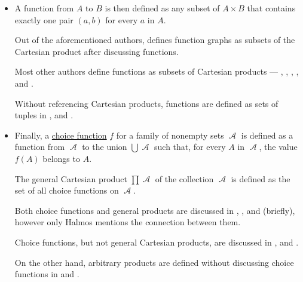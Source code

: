 \begin{remark}
\begin{itemize}
    \item A function from \( A \) to \( B \) is then defined as any subset of \( A \times B \) that contains exactly one pair \( (a, b) \) for every \( a \) in \( A \).

    Out of the aforementioned authors, \textcite[def. II.3.1]{Bourbaki2004TheoryOfSets} defines function graphs as subsets of the Cartesian product after discussing functions.

    Most other authors define functions as subsets of Cartesian products ---
    \cite[11]{Jech2006SetTheory},
    \cite[def. 6.2.8]{Hinman2005Logic},
    \cite[42]{Enderton1977SetTheory},
    \cite[30]{Halmos1960NaiveSetTheory},
    \cite[143]{КолмогоровДрагалин2006ЛогикаДополнительныеГлавы} and
    \cite[190]{Герасимов2014Вычислимость}.

    Without referencing Cartesian products, functions are defined as sets of tuples in
    \cite[def. I.6.3]{Kunen2013SetTheory},
    \cite[245]{Mendelson2015Logic} and
    \cite[\S 1.2.4]{КусраевКутателадзе2005БулевозначныйАнализ}.

    \item Finally, a \hyperref[def:choice_function]{choice function} \( f \) for a family of nonempty sets \( \mscrA \) is defined as a function from \( \mscrA \) to the union \( \bigcup \mscrA \) such that, for every \( A \) in \( \mscrA \), the value \( f(A) \) belongs to \( A \).

    The general Cartesian product \( \prod \mscrA \) of the collection \( \mscrA \) is defined as the set of all choice functions on \( \mscrA \).

    Both choice functions and general products are discussed in
    \cite[59; 60]{Halmos1960NaiveSetTheory},
    \cite[60; 151]{Enderton1977SetTheory},
    \cite[47; 53]{Jech2006SetTheory} and
    \cite[282; 285]{Mendelson2015Logic} (briefly), however only Halmos mentions the connection between them.

    Choice functions, but not general Cartesian products, are discussed in
    \cite[def. I.12.2]{Kunen2013SetTheory},
    \cite[def. 6.4.1]{Hinman2005Logic} and
    \cite[194]{Герасимов2014Вычислимость}.

    On the other hand, arbitrary products are defined without discussing choice functions in
    \cite[def. II.5.1]{Bourbaki2004TheoryOfSets} and
    \cite[146]{КолмогоровДрагалин2006ЛогикаВведение}.
  \end{itemize}
\end{remark}

